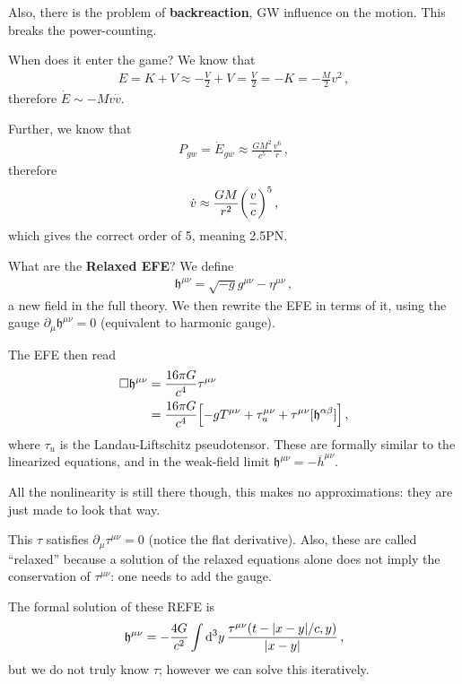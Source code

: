 \documentclass[main.tex]{subfiles}
\begin{document}
Also, there is the problem of \textbf{backreaction}, GW influence on the motion. 
This breaks the power-counting. 

When does it enter the game? We know that 
%
\begin{align}
E = K + V \approx - \frac{V}{2} + V = \frac{V}{2} = - K = - \frac{M}{2} v^2
\,,
\end{align}
%
therefore \(\dot{E} \sim - M v \dot{v}\). 

Further, we know that 
%
\begin{align}
P_{gw} = \dot{E}_{gw} \approx \frac{GM^2}{c^{5}} \frac{v^{6}}{r}
\,,
\end{align}
%
therefore 
%
\begin{align}
\dot{v} \approx \frac{GM}{r^2} \qty( \frac{v}{c} )^{5}
\,,
\end{align}
%
which gives the correct order of 5, meaning 2.5PN. 

What are the \textbf{Relaxed EFE}? 
We define 
%
\begin{align}
\mathfrak{h}^{\mu \nu  } = \sqrt{-g } g^{\mu \nu } -\eta^{\mu \nu }
\,,
\end{align}
%
a  new field in the full theory. 
We then rewrite the EFE in terms of it, using the gauge \(\partial_{\mu } \mathfrak{h}^{\mu \nu} = 0\) (equivalent to harmonic gauge). 

The EFE then read 
%
\begin{align}
\square \mathfrak{h}^{\mu \nu } &= \frac{16 \pi G}{c^{4}} \tau^{\mu \nu }  \\
&= \frac{16 \pi G}{c^{4}} \qty[-g T^{\mu \nu } + \tau^{\mu \nu }_{u} + \tau^{\mu  \nu }[ \mathfrak{h}^{\alpha \beta }]]
\,,
\end{align}
%
where \(\tau_u \) is the Landau-Liftschitz pseudotensor. 
These are formally similar to the linearized equations, and in the weak-field limit \(\mathfrak{h}^{\mu \nu } = - \overline{h}^{\mu \nu }\). 

All the nonlinearity is still there though, this makes no approximations: they are just made to look that way. 

This \(\tau \) satisfies \(\partial_{\mu } \tau^{\mu \nu } = 0\) (notice the flat derivative). 
Also, these are called ``relaxed'' because a solution of the relaxed equations alone does not imply the conservation of \(\tau^{\mu \nu }\): one needs to add the gauge. 

The formal solution of these REFE is 
%
\begin{align}
\mathfrak{h}^{\mu \nu } = - \frac{4G}{c^2} \int \dd[3]{y} 
\frac{\tau^{\mu \nu }(t - \abs{x-y} / c, y)}{\abs{x-y}}
\,,
\end{align}
%
but we do not truly know \(\tau \); however we can solve this iteratively. 
\end{document}
